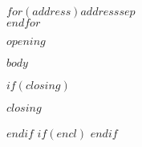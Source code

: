 \documentclass[DIN,
               pagenumber=false,
               firstfoot=false,
               enlargefirstpage=true,
               fontsize=11pt,
               fromalign=left,
               fromphone=true,
               fromemail=true%
             ]{scrlttr2}
\begin{document}
\begin{letter}{$for(address)$$address$$sep$\\$endfor$}
\opening{$opening$}

$body$

$if(closing)$
\closing{$closing$}
$endif$
$if(encl)$
$endif$

\end{letter}
\end{document}
